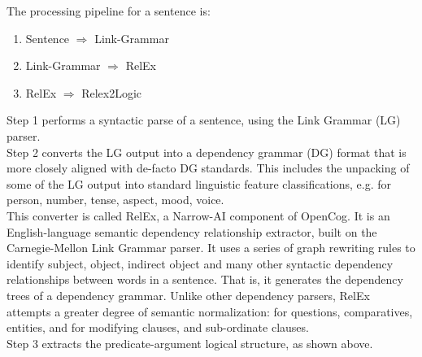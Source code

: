 The processing pipeline for a sentence is: 
\begin{enumerate}
	\item Sentence $\Rightarrow$ Link-Grammar
	\item Link-Grammar $\Rightarrow$ RelEx
	\item RelEx $\Rightarrow$ Relex2Logic
\end{enumerate}

Step 1 performs a syntactic parse of a sentence, using the Link Grammar (LG) parser. \\
Step 2 converts the LG output into a dependency grammar (DG) format that is more closely aligned with de-facto DG standards. This includes the unpacking of some of the LG output into standard linguistic feature classifications, e.g. for person, number, tense, aspect, mood, voice. \\
This converter is called RelEx, a Narrow-AI component of OpenCog. It is an English-language semantic dependency relationship extractor, built on the Carnegie-Mellon Link Grammar parser. It uses a series of graph rewriting rules to identify subject, object, indirect object and many other syntactic dependency relationships between words in a sentence. That is, it generates the dependency trees of a dependency grammar. 
Unlike other dependency parsers, RelEx attempts a greater degree of semantic normalization: for questions, comparatives, entities, and for modifying clauses, and sub-ordinate clauses. \\
Step 3 extracts the predicate-argument logical structure, as shown above.
